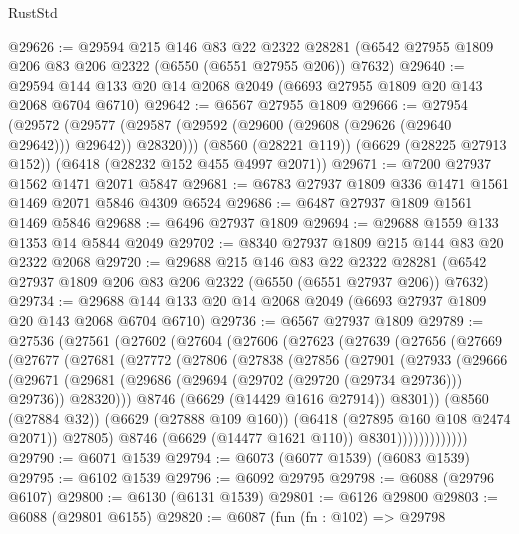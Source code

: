 \begin{lexlean}{RustStd}
\begin{coremodule}
@29626 := @29594
    @215
    @146
    @83
    @22
    @2322
    @28281
    (@6542 @27955 @1809 @206 @83 @206 @2322 (@6550 (@6551 @27955 @206)) @7632)
@29640 := @29594 @144 @133 @20 @14 @2068 @2049 (@6693 @27955 @1809 @20 @143 @2068 @6704 @6710)
@29642 := @6567 @27955 @1809
@29666 := @27954
    (@29572 (@29577 (@29587 (@29592 (@29600 (@29608 (@29626 (@29640 @29642))) @29642)) @28320)))
    (@8560 (@28221 @119))
    (@6629 (@28225 @27913 @152))
    (@6418 (@28232 @152 @455 @4997 @2071))
@29671 := @7200 @27937 @1562 @1471 @2071 @5847
@29681 := @6783 @27937 @1809 @336 @1471 @1561 @1469 @2071 @5846 @4309 @6524
@29686 := @6487 @27937 @1809 @1561 @1469 @5846
@29688 := @6496 @27937 @1809
@29694 := @29688 @1559 @133 @1353 @14 @5844 @2049
@29702 := @8340 @27937 @1809 @215 @144 @83 @20 @2322 @2068
@29720 := @29688
    @215
    @146
    @83
    @22
    @2322
    @28281
    (@6542 @27937 @1809 @206 @83 @206 @2322 (@6550 (@6551 @27937 @206)) @7632)
@29734 := @29688 @144 @133 @20 @14 @2068 @2049 (@6693 @27937 @1809 @20 @143 @2068 @6704 @6710)
@29736 := @6567 @27937 @1809
@29789 := @27536
    (@27561
      (@27602
        (@27604
          (@27606
            (@27623
              (@27639
                (@27656
                  (@27669
                    (@27677
                      (@27681
                        (@27772
                          (@27806
                            (@27838
                              (@27856
                                (@27901
                                  (@27933
                                    (@29666
                                      (@29671
                                        (@29681
                                          (@29686 (@29694 (@29702 (@29720 (@29734 @29736))) @29736))
                                          @28320)))
                                    @8746
                                    (@6629 (@14429 @1616 @27914))
                                    @8301))
                                (@8560 (@27884 @32))
                                (@6629 (@27888 @109 @160))
                                (@6418 (@27895 @160 @108 @2474 @2071))
                                @27805)
                              @8746
                              (@6629 (@14477 @1621 @110))
                              @8301)))))))))))))
@29790 := @6071 @1539
@29794 := @6073 (@6077 @1539) (@6083 @1539)
@29795 := @6102 @1539
@29796 := @6092 @29795
@29798 := @6088 (@29796 @6107)
@29800 := @6130 (@6131 @1539)
@29801 := @6126 @29800
@29803 := @6088 (@29801 @6155)
@29820 := @6087
    (fun (fn : @102) =>
    @29798

\end{coremodule}
\end{lexlean}
